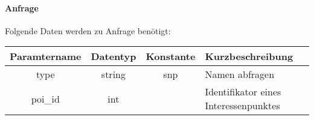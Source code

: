 \paragraph{Anfrage}Folgende Daten werden zu Anfrage benötigt:
\begin{table}[H]
	\begin{tabular}{|c|c|c|p{6.5cm}|}
		\hline
		\textbf{Paramtername} & \textbf{Datentyp} & \textbf{Konstante} & \textbf{Kurzbeschreibung}                                                                                               \\ \hline
		type                & string            & snp                & Namen abfragen \\ \hline
		poi\_id             & int               &                    & Identifikator eines Interessenpunktes \\ \hline
	\end{tabular}
\end{table}
